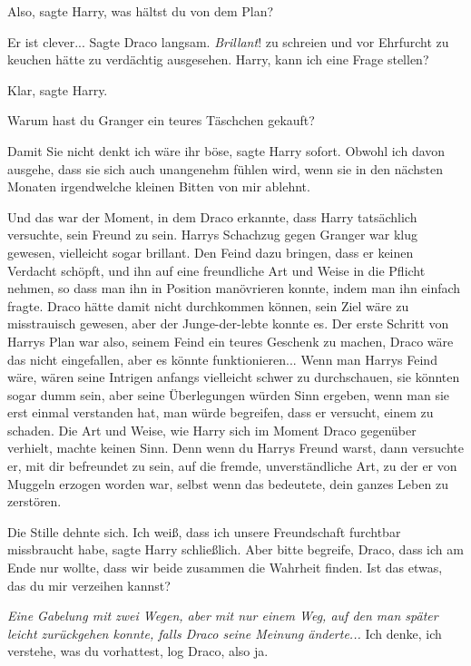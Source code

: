 \glqq{}Also\grqq{}, sagte Harry, \glqq{}was hältst du von dem Plan?\grqq{}

\glqq{}Er ist clever...\grqq{} Sagte Draco langsam. \emph{Brillant}! zu schreien
und vor Ehrfurcht zu keuchen hätte zu verdächtig ausgesehen. \glqq{}Harry, kann
ich eine Frage stellen?\grqq{}

\glqq{}Klar\grqq{}, sagte Harry.

\glqq{}Warum hast du Granger ein teures Täschchen gekauft?\grqq{}

\glqq{}Damit Sie nicht denkt ich wäre ihr böse\grqq{}, sagte Harry sofort. \glqq
Obwohl ich davon ausgehe, dass sie sich auch unangenehm fühlen wird, wenn sie in
den nächsten Monaten irgendwelche kleinen Bitten von mir ablehnt.\grqq{}

Und das war der Moment, in dem Draco erkannte, dass Harry tatsächlich versuchte,
sein Freund zu sein. Harrys Schachzug gegen Granger war klug gewesen, vielleicht
sogar brillant. Den Feind dazu bringen, dass er keinen Verdacht schöpft, und ihn
auf eine freundliche Art und Weise in die Pflicht nehmen, so dass man ihn in
Position manövrieren konnte, indem man ihn einfach fragte. Draco hätte damit
nicht durchkommen können, sein Ziel wäre zu misstrauisch gewesen, aber der
Junge-der-lebte konnte es. Der erste Schritt von Harrys Plan war also, seinem
Feind ein teures Geschenk zu machen, Draco wäre das nicht eingefallen, aber es
könnte funktionieren... Wenn man Harrys Feind wäre, wären seine Intrigen anfangs
vielleicht schwer zu durchschauen, sie könnten sogar dumm sein, aber seine
Überlegungen würden Sinn ergeben, wenn man sie erst einmal verstanden hat, man
würde begreifen, dass er versucht, einem zu schaden. Die Art und Weise, wie
Harry sich im Moment Draco gegenüber verhielt, machte keinen Sinn. Denn wenn du
Harrys Freund warst, dann versuchte er, mit dir befreundet zu sein, auf die
fremde, unverständliche Art, zu der er von Muggeln erzogen worden war, selbst
wenn das bedeutete, dein ganzes Leben zu zerstören.

Die Stille dehnte sich. \glqq{}Ich weiß, dass ich unsere Freundschaft furchtbar
missbraucht habe\grqq{}, sagte Harry schließlich. \glqq{}Aber bitte begreife,
Draco, dass ich am Ende nur wollte, dass wir beide zusammen die Wahrheit finden.
Ist das etwas, das du mir verzeihen kannst?\grqq{}

\emph{Eine Gabelung mit zwei Wegen, aber mit nur einem Weg, auf den man später
leicht zurückgehen konnte, falls Draco seine Meinung änderte...} \glqq{}Ich
denke, ich verstehe, was du vorhattest\grqq{}, log Draco, \glqq{}also ja.\grqq{}

